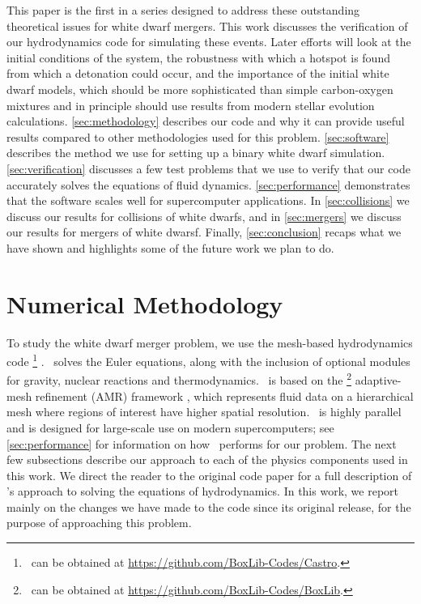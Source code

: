 \documentclass[12pt]{article}
\begin{document}
This paper is the first in a series designed to address these
outstanding theoretical issues for white dwarf mergers. This work 
discusses the verification of our hydrodynamics code for simulating
these events. Later efforts will look at the initial conditions of the
system, the robustness with which a hotspot is found from which a
detonation could occur, and the importance of the initial white dwarf
models, which should be more sophisticated than simple carbon-oxygen
mixtures and in principle should use results from modern stellar
evolution calculations. \autoref{sec:methodology}
describes our code and why it can provide useful results compared to
other methodologies used for this problem. 
\autoref{sec:software} describes the method we use for setting up a
binary white dwarf simulation. \autoref{sec:verification} discusses a few
test problems that we use to verify that our code accurately
solves the equations of fluid dynamics. \autoref{sec:performance}
demonstrates that the software scales well for supercomputer
applications. In \autoref{sec:collisions} we discuss our results for
collisions of white dwarfs, and in \autoref{sec:mergers} we discuss
our results for mergers of white dwarsf. Finally, \autoref{sec:conclusion}
recaps what we have shown and highlights some of the future work we
plan to do.



\newpage
\section{Numerical Methodology}
\label{sec:methodology}

To study the white dwarf merger problem, we use the mesh-based
hydrodynamics code \castro\footnote{\castro\ can be obtained at \url{https://github.com/BoxLib-Codes/Castro}.} \citep{castro}.
\castro\ solves the Euler
equations, along with the inclusion of optional modules for gravity,
nuclear reactions and thermodynamics. \castro\ is based on the \boxlib
\footnote{\boxlib\ can be obtained at \url{https://github.com/BoxLib-Codes/BoxLib}.}
adaptive-mesh refinement (AMR) framework \citep{rendleman:2000}, which
represents fluid data on a hierarchical mesh where regions of interest have higher
spatial resolution. \castro\ is highly parallel and is designed for
large-scale use on modern supercomputers; see 
\autoref{sec:performance} for information on how \castro\ performs for our
problem. The next few subsections describe our approach to each of the
physics components used in this work. We direct the reader to the
original code paper for a full description of \castro's approach to
solving the equations of hydrodynamics. In this work, we report mainly
on the changes we have made to the code since its original release,
for the purpose of approaching this problem.
\end{document}
